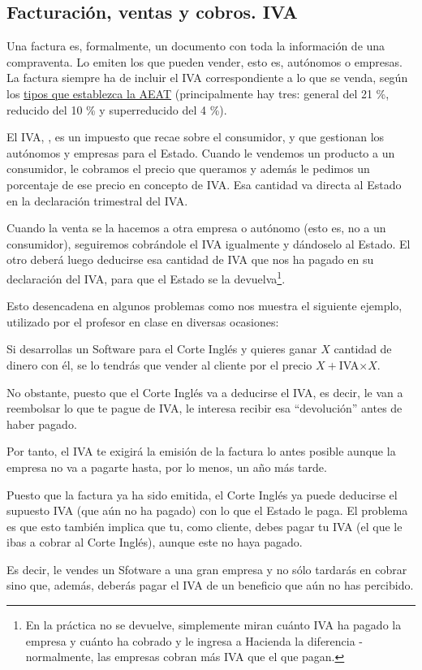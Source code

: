 \documentclass[nochap,palatino,shortheader]{apuntes}
\begin{document}
\subsection{Facturación, ventas y cobros. IVA}

Una factura es, formalmente, un documento con toda la información de una compraventa. Lo emiten los que pueden vender, esto es, autónomos o empresas. La factura siempre ha de incluir el IVA correspondiente a lo que se venda, según los \href{http://www.agenciatributaria.es/static_files/AEAT/Contenidos_Comunes/La_Agencia_Tributaria/Segmentos_Usuarios/Empresas_y_profesionales/Novedades_IVA_2014/Nuevos_tipos_IVA.pdf}{tipos que establezca la AEAT} (principalmente hay tres: general del 21 \%, reducido del 10 \% y superreducido del 4 \%).

El IVA, , es un impuesto que recae sobre el consumidor, y que gestionan los autónomos y empresas para el Estado. Cuando le vendemos un producto a un consumidor, le cobramos el precio que queramos y además le pedimos un porcentaje de ese precio en concepto de IVA. Esa cantidad va directa al Estado en la declaración trimestral del IVA.

Cuando la venta se la hacemos a otra empresa o autónomo (esto es, no a un consumidor), seguiremos cobrándole el IVA igualmente y dándoselo al Estado. El otro deberá luego deducirse esa cantidad de IVA que nos ha pagado en su declaración del IVA, para que el Estado se la devuelva\footnote{En la práctica no se devuelve, simplemente miran cuánto IVA ha pagado la empresa y cuánto ha cobrado y le ingresa a Hacienda la diferencia - normalmente, las empresas cobran más IVA que el que pagan.}.

Esto desencadena en algunos problemas como nos muestra el siguiente ejemplo, utilizado por el profesor en clase en diversas ocasiones:
\begin{example}
Si desarrollas un Software para el Corte Inglés y quieres ganar $X$ cantidad de dinero con él, se lo tendrás que vender al cliente por el precio $X+$IVA$\times X$.

No obstante, puesto que el Corte Inglés va a deducirse el IVA, es decir, le van a reembolsar lo que te pague de IVA, le interesa recibir esa ``devolución'' antes de haber pagado.

Por tanto, el IVA te exigirá la emisión de la factura lo antes posible aunque la empresa no va a pagarte hasta, por lo menos, un año más tarde.

Puesto que la factura ya ha sido emitida, el Corte Inglés ya puede deducirse el supuesto IVA (que aún no ha pagado) con lo que el Estado le paga. El problema es que esto también implica que tu, como cliente, debes pagar tu IVA (el que le ibas a cobrar al Corte Inglés), aunque este no haya pagado.

Es decir, le vendes un Sfotware a una gran empresa y no sólo tardarás en cobrar sino que, además, deberás pagar el IVA de un beneficio que aún no has percibido.
\end{example}
\end{document}
